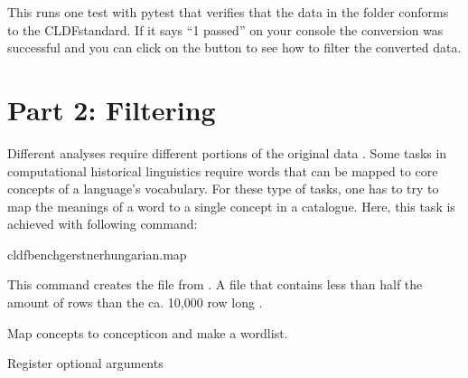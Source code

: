 \documentclass[letterpaper,10pt,english]{sphinxmanual}
\begin{document}
{{{{\sphinxAtStartPar
This runs one test with pytest that verifies that the data in the folder
 conforms to the CLDF\sphinxhyphen{}standard. If it says “1 passed” on your console
the conversion was successful and you can click on the  button
to see how to filter the converted data.

\sphinxstepscope


\chapter{Part 2: Filtering}
\label{\detokenize{filter:part-2-filtering}}\label{\detokenize{filter::doc}}
\sphinxAtStartPar
Different analyses require different portions of the original data
. Some tasks in computational historical
linguistics require words that can be mapped to core concepts of a language’s
vocabulary. For these type of tasks, one has to try to map the
meanings of a word to a single concept in a catalogue. Here,
this task is achieved with following command:

\begin{sphinxVerbatim}[commandchars=\\\{\}]
cldfbenchgerstnerhungarian.map
\end{sphinxVerbatim}

\sphinxAtStartPar
This command creates the file  from .
A file that contains less than half the amount of rows than the ca. 10,000
row long .

\label{\detokenize{filter:module-gerstnerhungariancommands.map}}
\sphinxAtStartPar
Map concepts to concepticon and make a wordlist.

\begin{fulllineitems}
\label{\detokenize{filter:gerstnerhungariancommands.map.register}}
\pysigstartsignatures
{}
\pysigstopsignatures
\sphinxAtStartPar
Register optional arguments


\end{fulllineitems}}}}}
\end{document}
